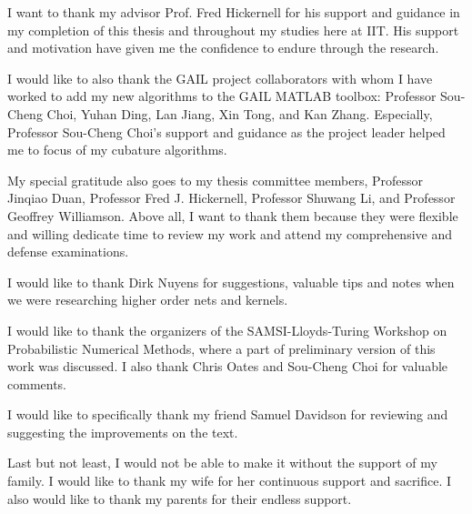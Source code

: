 \documentclass{iitthesis}          %
\begin{document}
\begin{acknowledgement}     %
	\par  I want to thank my advisor Prof. Fred Hickernell for his support and guidance in my completion of this thesis and throughout my studies here at IIT. 
	His support and motivation have given me the confidence to endure through the research. 
	
	I would like to also thank the GAIL project collaborators with
	whom I have worked to add my new algorithms to the GAIL MATLAB toolbox: Professor Sou-Cheng Choi,
	Yuhan Ding, Lan Jiang, Xin Tong, and Kan Zhang. Especially, Professor Sou-Cheng Choi’s support and guidance as the project leader helped me to focus of my cubature algorithms.
	
	My special gratitude also goes to my thesis committee members, Professor Jinqiao Duan,
	Professor Fred J. Hickernell, Professor Shuwang Li, and Professor Geoffrey Williamson. Above all, I want to thank them because they were flexible and willing dedicate time to review my work and attend my comprehensive and defense examinations.
	
	I would like to thank Dirk Nuyens for suggestions, valuable tips and notes when we were researching higher order nets and kernels.
	
	I would like to thank the organizers of the SAMSI-Lloyds-Turing Workshop on Probabilistic Numerical Methods, where a part of preliminary version of this work was discussed.  I also thank Chris Oates and Sou-Cheng Choi for valuable comments.
	
	I would like to specifically thank my friend Samuel Davidson for reviewing and suggesting the improvements on the text.
	
	Last but not least, I would not be able to make it without the support of my family. I would like to thank my wife for her continuous support and sacrifice. I also would like to thank my parents for their endless support.


	
\end{acknowledgement}

\tableofcontents
\end{document}
